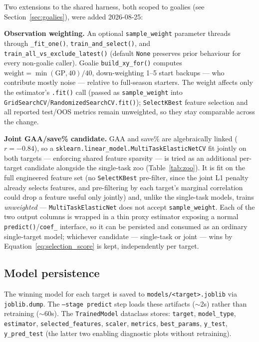 \documentclass[11pt, a4paper]{article}
\begin{document}
Two extensions to the shared harness, both scoped to goalies (see Section~\ref{sec:goalies}),
were added 2026-08-25:

\textbf{Observation weighting.} An optional \texttt{sample\_weight} parameter threads through
\texttt{\_fit\_one()}, \texttt{train\_and\_select()}, and \texttt{train\_all\_vs\_exclude\_latest()}
(default \texttt{None} preserves prior behaviour for every non-goalie caller). Goalie
\texttt{build\_xy\_for()} computes $\text{weight} = \min(\text{GP}, 40) / 40$, down-weighting
1--5 start backups — who contribute mostly noise — relative to full-season starters. The weight
affects only the estimator's \texttt{.fit()} call (passed as \texttt{sample\_weight} into
\texttt{GridSearchCV}/\texttt{RandomizedSearchCV.fit()}); \texttt{SelectKBest} feature selection
and all reported test/OOS metrics remain unweighted, so they stay comparable across the change.

\textbf{Joint GAA/save\% candidate.} GAA and save\% are algebraically linked ($r = -0.84$), so a
\texttt{sklearn.linear\_model.MultiTaskElasticNetCV} fit jointly on both targets — enforcing
shared feature sparsity — is tried as an additional per-target candidate alongside the
single-task zoo (Table~\ref{tab:zoo}). It is fit on the full engineered feature set (no
\texttt{SelectKBest} pre-filter, since the joint L1 penalty already selects features, and
pre-filtering by each target's marginal correlation could drop a feature useful only jointly)
and, unlike the single-task models, trains \emph{unweighted} — \texttt{MultiTaskElasticNet} does
not accept \texttt{sample\_weight}. Each of the two output columns is wrapped in a thin proxy
estimator exposing a normal \texttt{predict()}/\texttt{coef\_} interface, so it can be persisted
and consumed as an ordinary single-target model; whichever candidate — single-task or joint —
wins by Equation~\ref{eq:selection_score} is kept, independently per target.

\subsection{Model persistence}

The winning model for each target is saved to \texttt{models/<target>.joblib} via
\texttt{joblib.dump}. The \texttt{--stage predict} step loads these artifacts ($\sim$2s) rather
than retraining ($\sim$60s). The \texttt{TrainedModel} dataclass stores:
\texttt{target}, \texttt{model\_type}, \texttt{estimator}, \texttt{selected\_features},
\texttt{scaler}, \texttt{metrics}, \texttt{best\_params}, \texttt{y\_test}, \texttt{y\_pred\_test}
(the latter two enabling diagnostic plots without retraining).
\end{document}
